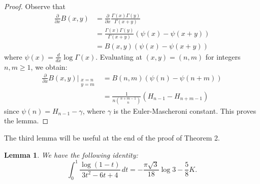 \documentclass{amsart}
\numberwithin{equation}{section}
\newtheorem{lemma}{Lemma}
\begin{document}
\begin{proof}
    Observe that
    \begin{align*}
        \frac{\partial}{\partial x}B(x,y)&=\frac{\partial}{\partial x}\frac{\Gamma(x)\Gamma(y)}{\Gamma(x+y)}\\&=\frac{\Gamma(x)\Gamma(y)}{\Gamma(x+y)}(\psi(x)-\psi(x+y))\\&=B(x,y)(\psi(x)-\psi(x+y))
    \end{align*}
    where $\psi(x)=\frac{d}{dx}\log{\Gamma(x)}$. Evaluating at $(x,y)=(n,m)$ for integers $n,m\ge1$, we obtain:
    \begin{align*}
        \frac{\partial}{\partial x}B(x,y)\Bigg|_{\substack{x=n\\y=m}}&=B(n,m)(\psi(n)-\psi(n+m))\\&=\frac{1}{n\binom{n+m-1}{n}}(H_{n-1}-H_{n+m-1})
    \end{align*}
    since $\psi(n)=H_{n-1}-\gamma$, where $\gamma$ is the Euler-Mascheroni constant. This proves the lemma.
\end{proof}
The third lemma will be useful at the end of the proof of Theorem 2.
\begin{lemma}
    We have the following identity:
    \begin{equation}
    \int_0^1\frac{\log(1-t)}{3t^2-6t+4}\,dt=-\frac{\pi\sqrt{3}}{18}\log3-\frac{5}{8}K.
    \label{lem3}
    \end{equation}
\end{lemma}
\end{document}
